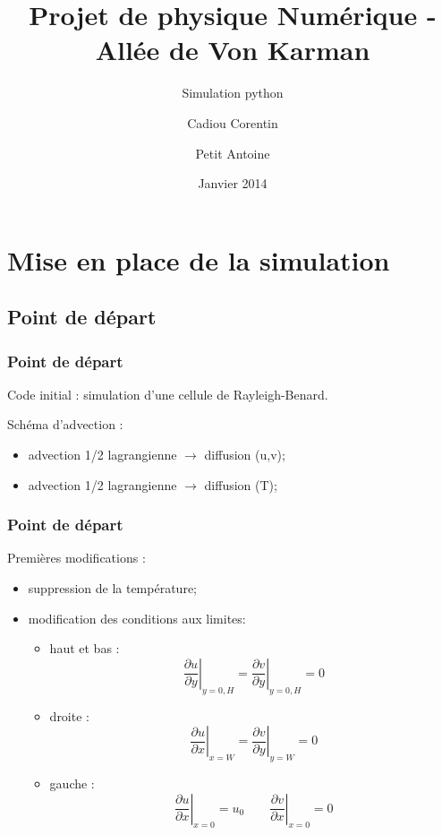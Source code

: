 \documentclass{beamer}
\title{Projet de physique Numérique - Allée de Von Karman}
\subtitle{Simulation python}
\author[Cadiou Corentin \and Petit Antoine] %
{Cadiou Corentin \and Petit Antoine}
\date{Janvier 2014}
\begin{document}
  \frame{\titlepage}

  \section{Mise en place de la simulation}
  \subsection{Point de départ}
  \begin{frame}
    \frametitle{Point de départ}
    Code initial : simulation d'une cellule de Rayleigh-Benard.

    Schéma d'advection :
    \begin{itemize}
      \item advection 1/2 lagrangienne $\rightarrow$ diffusion (u,v);
      \item advection 1/2 lagrangienne $\rightarrow$ diffusion (T);
    \end{itemize}
  \end{frame}
  \begin{frame}
    \frametitle{Point de départ}
    Premières modifications :
    \begin{itemize}
      \item<1-> suppression de la température;
      \item<2-> modification des conditions aux limites:
        \begin{itemize}
          \item<3-> haut et bas : 
            \[ \left. \frac{\partial u}{\partial y}\right|_{y=0,H} = 
            \left. \frac{\partial v}{\partial y}\right|_{y=0,H} = 0 \] 
          \item<4-> droite :
            \[ \left. \frac{\partial u}{\partial x}\right|_{x=W} = 
            \left. \frac{\partial v}{\partial y}\right|_{y=W} = 0 \]
          \item<5-> gauche :
            \[ \left. \frac{\partial u}{\partial x}\right|_{x=0} = u_0
            \qquad \left. \frac{\partial v}{\partial x}\right|_{x=0} = 0\]
        \end{itemize}
    \end{itemize}
  \end{frame}
\end{document}
